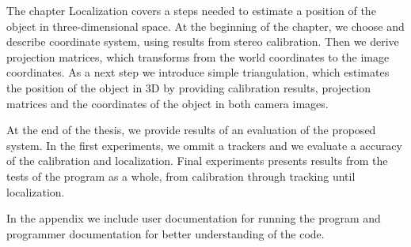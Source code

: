 The chapter Localization covers a steps needed to estimate a position of the
object in three-dimensional space. At the beginning of the chapter, we choose
and describe coordinate system, using results from stereo calibration. Then we
derive projection matrices, which transforms from the world coordinates to the
image coordinates. As a next step we introduce simple triangulation, which
estimates the position of the object in 3D by providing calibration results,
projection matrices and the coordinates of the object in both camera images.

At the end of the thesis, we provide results of an evaluation of the proposed
system. In the first experiments, we ommit a trackers and we evaluate a
accuracy of the calibration and localization. Final experiments presents
results from the tests of the program as a whole, from calibration through
tracking until localization. 

In the appendix we include user documentation for running the program and
programmer documentation for better understanding of the code.



